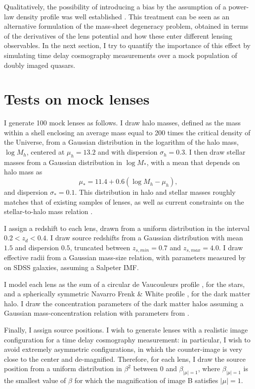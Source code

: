 \documentclass[usenatbib]{mnras}
\def\betamu{\beta_{|\mu|=1}}
\begin{document}
Qualitatively, the possibility of introducing a bias by the assumption of a power-law density profile was well established \citep{S+S13}.
This treatment can be seen as an alternative formulation of the mass-sheet degeneracy problem, obtained in terms of the derivatives of the lens potential and how these enter different lensing observables.
In the next section, I try to quantify the importance of this effect by simulating time delay cosmography measurements over a mock population of doubly imaged quasars.

\section{Tests on mock lenses}\label{sect:mock}

I generate 100 mock lenses as follows. I draw halo masses, defined as the mass within a shell enclosing an average mass equal to 200 times the critical density of the Universe, from a Gaussian distribution in the logarithm of the halo mass, $\log{M_h}$, centered at $\mu_h=13.2$ and with dispersion $\sigma_h=0.3$. I then draw stellar masses from a Gaussian distribution in $\log{M_*}$, with a mean that depends on halo mass as
\begin{equation}
\mu_* = 11.4 + 0.6(\log{M_h} - \mu_h),
\end{equation}
and dispersion $\sigma_*=0.1$.
This distribution in halo and stellar masses roughly matches that of existing samples of lenses, as well as current constraints on the stellar-to-halo mass relation \citep{Gav++07, Aug++10, Beh++13}.

I assign a redshift to each lens, drawn from a uniform distribution in the interval $0.2 < z_d < 0.4$. I draw source redshifts from a Gaussian distribution with mean $1.5$ and dispersion $0.5$, truncated between $z_{s,min}=0.7$ and $z_{s,max}=4.0$.
I draw effective radii from a Gaussian mass-size relation, with parameters measured by \citet{New++12} on SDSS galaxies, assuming a Salpeter IMF.

I model each lens as the sum of a circular de Vaucouleurs profile \citep{deV48}, for the stars, and a spherically symmetric Navarro Frenk \& White profile \citep[NFW][]{NFW97}, for the dark matter halo.
I draw the concentration parameters of the dark matter halos assuming a Gaussian mass-concentration relation with parameters from \citet{Mac++08}.

Finally, I assign source positions.
I wish to generate lenses with a realistic image configuration for a time delay cosmography measurement: in particular, I wish to avoid extremely asymmetric configurations, in which the counter-image is very close to the center and de-magnified.
Therefore, for each lens, I draw the source position from a uniform distribution in $\beta^2$ between 0 and $\betamu$, where $\betamu$ is the smallest value of $\beta$ for which the magnification of image B satisfies $|\mu|=1$. 
\end{document}
